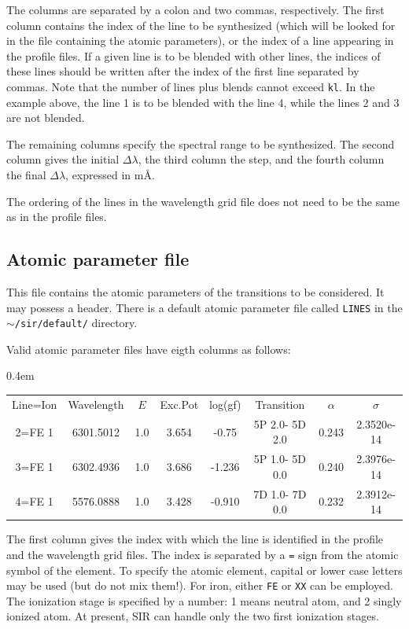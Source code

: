 \documentclass[11pt]{report}
\begin{document}
The columns are separated by a colon and two commas, respectively. The
first column contains the index of the line to be synthesized (which
will be looked for in the file containing the atomic parameters), or
the index of a line appearing in the profile files. If a given line is
to be blended with other lines, the indices of these lines should be
written after the index of the first line separated by commas. Note
that the number of lines plus blends cannot exceed {\tt kl}. In the
example above, the line 1 is to be blended with the line 4, while the
lines 2 and 3 are not blended.

The remaining columns specify the spectral range to be synthesized. The
second column gives the initial $\Delta \lambda$, the third column the
step, and the fourth column the final $\Delta \lambda$, expressed in m\AA\/. 

The ordering of the lines in the wavelength grid file does not need to
be the same as in the profile files. 

\subsection{Atomic parameter file}
\label{damping}
This file contains the atomic parameters of the transitions to be
considered. It may possess a header. There is a default atomic
parameter file called {\tt LINES} in the {\tt $\sim$/sir/default/} directory.

Valid atomic parameter files have eigth columns as follows:
\begin{center}
\tabcolsep 0.4em
\tt
\begin{tabular}{cccccccc}
 Line=Ion & Wavelength & $E$ & Exc.Pot & log(gf) &  Transition & $\alpha$ & $\sigma$  \\
   2=FE 1 & 6301.5012 &   1.0 & 3.654 & -0.75  & 5P 2.0- 5D 2.0 & 0.243  & 2.3520e-14 \\
   3=FE 1 & 6302.4936 &   1.0 & 3.686 & -1.236 & 5P 1.0- 5D 0.0 & 0.240  & 2.3976e-14  \\
   4=FE 1 & 5576.0888 &   1.0 & 3.428 & -0.910 & 7D 1.0- 7D 0.0 & 0.232  & 2.3912e-14 \\
\end{tabular}
\end{center}
The first column gives the index with which the line is identified in
the profile and the wavelength grid files. The index is separated by a
{\tt =} sign from the atomic symbol of the element. To specify the
atomic element, capital or lower case letters may be used (but do not
mix them!). For iron, either {\tt FE} or {\tt XX} can be employed. The
ionization stage is specified by a number: 1 means neutral atom, and 2
singly ionized atom. At present, SIR can handle only the two first
ionization stages.
\end{document}

